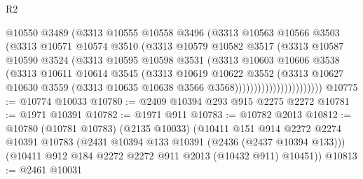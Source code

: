 \begin{lexlean}{R2}
\begin{coremodule}
                            @10550
                            @3489
                            (@3313
                              @10555
                              @10558
                              @3496
                              (@3313
                                @10563
                                @10566
                                @3503
                                (@3313
                                  @10571
                                  @10574
                                  @3510
                                  (@3313
                                    @10579
                                    @10582
                                    @3517
                                    (@3313
                                      @10587
                                      @10590
                                      @3524
                                      (@3313
                                        @10595
                                        @10598
                                        @3531
                                        (@3313
                                          @10603
                                          @10606
                                          @3538
                                          (@3313
                                            @10611
                                            @10614
                                            @3545
                                            (@3313
                                              @10619
                                              @10622
                                              @3552
                                              (@3313
                                                @10627
                                                @10630
                                                @3559
                                                (@3313
                                                  @10635
                                                  @10638
                                                  @3566
                                                  @3568)))))))))))))))))))))))
@10775 := @10774 @10033
@10780 := @2409 @10394 @293 @915 @2275 @2272
@10781 := @1971 @10391
@10782 := @1971 @911
@10783 := @10782 @2013
@10812 := @10780
    (@10781 @10783)
    (@2135 @10033)
    (@10411
      @151
      @914
      @2272
      @2274
      @10391
      @10783
      (@2431 @10394 @133 @10391 (@2436 (@2437 @10394 @133)))
      (@10411 @912 @184 @2272 @2272 @911 @2013 (@10432 @911) @10451))
@10813 := @2461 @10031

\end{coremodule}
\end{lexlean}
